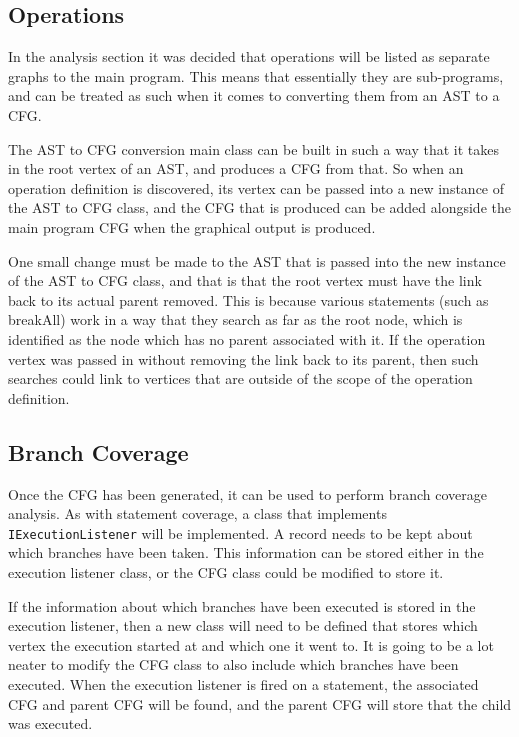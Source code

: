 \subsection{Operations}

In the analysis section it was decided that operations will be listed as separate graphs to the main program. This means that essentially they are sub-programs, and can be treated as such when it comes to converting them from an AST to a CFG.

The AST to CFG conversion main class can be built in such a way that it takes in the root vertex of an AST, and produces a CFG from that. So when an operation definition is discovered, its vertex can be passed into a new instance of the AST to CFG class, and the CFG that is produced can be added alongside the main program CFG when the graphical output is produced.

One small change must be made to the AST that is passed into the new instance of the AST to CFG class, and that is that the root vertex must have the link back to its actual parent removed. This is because various statements (such as breakAll) work in a way that they search as far as the root node, which is identified as the node which has no parent associated with it. If the operation vertex was passed in without removing the link back to its parent, then such searches could link to vertices that are outside of the scope of the operation definition. 


\subsection{Branch Coverage}

Once the CFG has been generated, it can be used to perform branch coverage analysis. As with statement coverage, a class that implements \verb|IExecutionListener| will be implemented. A record needs to be kept about which branches have been taken. This information can be stored either in the execution listener class, or the CFG class could be modified to store it.

If the information about which branches have been executed is stored in the execution listener, then a new class will need to be defined that stores which vertex the execution started at and which one it went to. It is going to be a lot neater to modify the CFG class to also include which branches have been executed. When the execution listener is fired on a statement, the associated CFG and parent CFG will be found, and the parent CFG will store that the child was executed.

